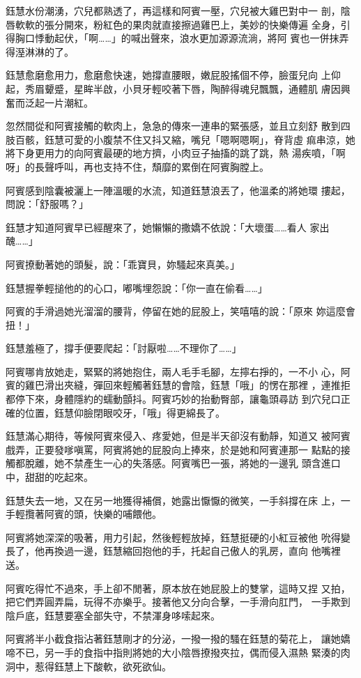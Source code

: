 鈺慧水份潮湧，穴兒都熟透了，再這樣和阿賓一壓，穴兒被大雞巴對中一
剖，陰唇軟軟的張分開來，粉紅色的果肉就直接擦過雞巴上，美妙的快樂傳遍
全身，引得胸口悸動起伏，「啊……」的喊出聲來，浪水更加源源流淌，將阿
賓也一併抹弄得溼淋淋的了。

鈺慧愈磨愈用力，愈磨愈快速，她撐直腰眼，嫩屁股搖個不停，臉蛋兒向
上仰起，秀眉顰蹙，星眸半啟，小貝牙輕咬著下唇，陶醉得魂兒飄飄，通體肌
膚因興奮而泛起一片潮紅。

忽然間從和阿賓接觸的軟肉上，急急的傳來一連串的緊張感，並且立刻舒
散到四肢百骸，鈺慧可愛的小腹禁不住又抖又縮，嘴兒「嗯啊嗯啊」，脊背虛
痲串涼，她將下身更用力的向阿賓最硬的地方擠，小肉豆子抽搐的跳了跳，熱
湯疾噴，「啊呀」的長聲呼叫，再也支持不住，頹靡的累倒在阿賓胸膛上。

阿賓感到陰囊被灑上一陣溫暖的水流，知道鈺慧浪丟了，他溫柔的將她環
摟起，問說：「舒服嗎？」

鈺慧才知道阿賓早已經醒來了，她懶懶的撒嬌不依說：「大壞蛋……看人
家出醜……」

阿賓撩動著她的頭髮，說：「乖寶貝，妳騷起來真美。」

鈺慧握拳輕搥他的的心口，嘟嘴埋怨說：「你一直在偷看……」

阿賓的手滑過她光溜溜的腰背，停留在她的屁股上，笑嘻嘻的說：「原來
妳這麼會扭！」

鈺慧羞極了，撐手便要爬起：「討厭啦……不理你了……」

阿賓哪肯放她走，緊緊的將她抱住，兩人毛手毛腳，左擰右掙的，一不小
心，阿賓的雞巴滑出夾縫，彈回來輕觸著鈺慧的會陰，鈺慧「哦」的愣在那裡
，連推拒都停下來，身體隱約的蠕動顫抖。阿賓巧妙的抬動臀部，讓龜頭尋訪
到穴兒口正確的位置，鈺慧仰臉閉眼咬牙，「哦」得更綿長了。

鈺慧滿心期待，等候阿賓來侵入、疼愛她，但是半天卻沒有動靜，知道又
被阿賓戲弄，正要發嗲嗔罵，阿賓將她的屁股向上捧來，於是她和阿賓連那一
點點的接觸都脫離，她不禁產生一心的失落感。阿賓嘴巴一張，將她的一邊乳
頭含進口中，甜甜的吃起來。

鈺慧失去一地，又在另一地獲得補償，她露出懨懨的微笑，一手斜撐在床
上，一手輕攬著阿賓的頭，快樂的哺餵他。

阿賓將她深深的吸著，用力引起，然後輕輕放掉，鈺慧挺硬的小紅豆被他
吮得變長了，他再換過一邊，鈺慧縮回抱他的手，托起自己傲人的乳房，直向
他嘴裡送。

阿賓吃得忙不過來，手上卻不閒著，原本放在她屁股上的雙掌，這時又捏
又拍，把它們弄圓弄扁，玩得不亦樂乎。接著他又分向合擊，一手滑向肛門，
一手欺到陰戶底，鈺慧要塞全部失守，不禁渾身哆嗦起來。

阿賓將半小截食指沾著鈺慧剛才的分泌，一撥一撥的騷在鈺慧的菊花上，
讓她嬌啼不已，另一手的食指中指則將她的大小陰唇撩撥夾拉，偶而侵入濕熱
緊湊的肉洞中，惹得鈺慧上下酸軟，欲死欲仙。

